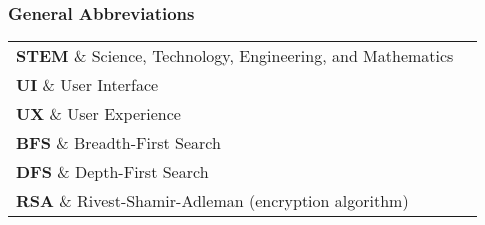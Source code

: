 \subsubsection{General Abbreviations}

\begin{tabular}{ll}
    \textbf{STEM} \& Science, Technology, Engineering, and Mathematics \\
    \textbf{UI} \& User Interface \\
    \textbf{UX} \& User Experience \\
    \textbf{BFS} \& Breadth-First Search \\
    \textbf{DFS} \& Depth-First Search \\
    \textbf{RSA} \& Rivest-Shamir-Adleman (encryption algorithm) \\
\end{tabular}
